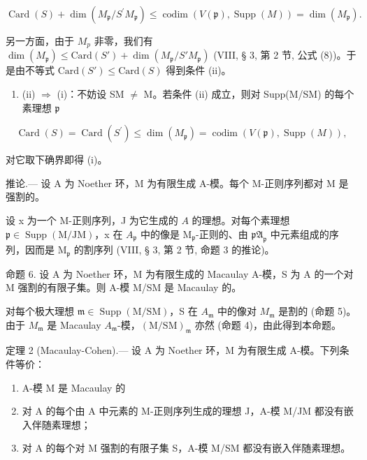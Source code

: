 \[
\operatorname{Card} (S) + \dim \left(M _ {\mathfrak {p}} / S ^ {\prime} M _ {\mathfrak {p}}\right) \leqslant \operatorname{codim} \left(V (\mathfrak {p}), \operatorname{Supp} (M)\right) = \dim \left(M _ {\mathfrak {p}}\right).
\]

另一方面，由于 \(M_{p}\) 非零，我们有 \(\dim(M_{\mathfrak{p}}) \leqslant \text{Card}(S') + \dim(M_{\mathfrak{p}}/S'M_{\mathfrak{p}})\) (VIII, § 3, 第 2 节, 公式 (8))。于是由不等式 \(\text{Card}(S') \leqslant \text{Card}(S)\) 得到条件 (ii)。

\begin{enumerate}
\def\labelenumi{(\roman{enumi})}
\setcounter{enumi}{1}
\tightlist
\item
  (ii) \(\Rightarrow\) (i)：不妨设 SM \(\neq\) M。若条件 (ii) 成立，则对 Supp(M/SM) 的每个素理想 \(\mathfrak{p}\)
\end{enumerate}

\[
\operatorname{Card} (S) = \operatorname{Card} \left(S ^ {\prime}\right) \leqslant \dim \left(M _ {\mathfrak {p}}\right) = \operatorname{codim} (V (\mathfrak {p}), \operatorname{Supp} (M)),
\]

对它取下确界即得 (i)。

推论.--- 设 A 为 Noether 环，M 为有限生成 A-模。每个 M-正则序列都对 M 是强割的。

设 x 为一个 M-正则序列，J 为它生成的 \(A\) 的理想。对每个素理想 \(\mathfrak{p} \in \operatorname{Supp}(\mathrm{M/JM})\)，x 在 \(A_{\mathfrak{p}}\) 中的像是 \(\mathrm{M}_{\mathfrak{p}}\)-正则的、由 \(\mathfrak{pA}_{\mathfrak{p}}\) 中元素组成的序列，因而是 \(\mathrm{M}_{\mathfrak{p}}\) 的割序列 (VIII, § 3, 第 2 节, 命题 3 的推论)。

命题 6. 设 A 为 Noether 环，M 为有限生成的 Macaulay A-模，S 为 A 的一个对 M 强割的有限子集。则 A-模 M/SM 是 Macaulay 的。

对每个极大理想 \(\mathfrak{m} \in \operatorname{Supp}(\mathrm{M} / \mathrm{SM})\)，S 在 \(A_{\mathfrak{m}}\) 中的像对 \(M_{\mathfrak{m}}\) 是割的 (命题 5)。由于 \(M_{\mathfrak{m}}\) 是 Macaulay \(A_{\mathfrak{m}}\)-模，\((\mathrm{M} / \mathrm{SM})_{\mathfrak{m}}\) 亦然 (命题 4)，由此得到本命题。

定理 2 (Macaulay-Cohen).--- 设 A 为 Noether 环，M 为有限生成 A-模。下列条件等价：

\begin{enumerate}
\def\labelenumi{(\roman{enumi})}
\item
  A-模 M 是 Macaulay 的
\item
  对 A 的每个由 A 中元素的 M-正则序列生成的理想 J，A-模 M/JM 都没有嵌入伴随素理想；
\item
  对 A 的每个对 M 强割的有限子集 S，A-模 M/SM 都没有嵌入伴随素理想。
\end{enumerate}

